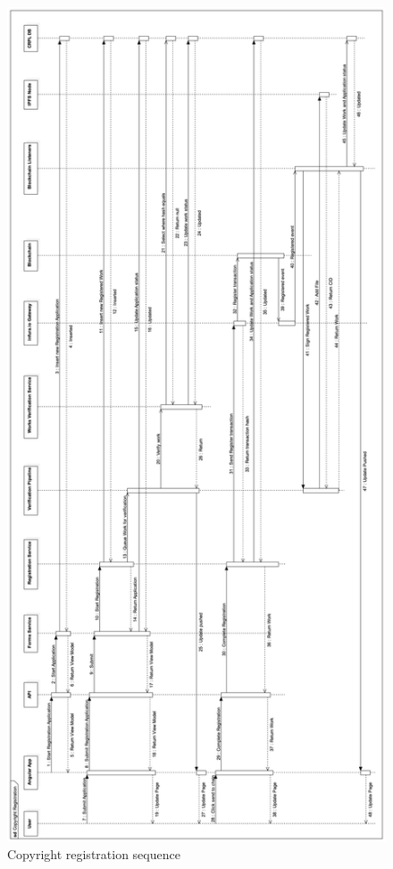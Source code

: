 \begin{figure}[H]
\caption{Copyright registration sequence}
\centering
\includegraphics[width=\textwidth,height=0.9\textheight,keepaspectratio]{images/operational/CopyrightRegistration}
\end{figure}

